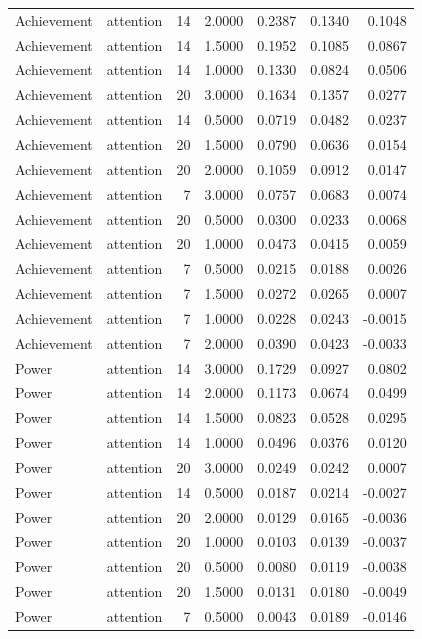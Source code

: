 \begin{tabular}{llrrrrr}
Achievement & attention & 14 & 2.0000 & 0.2387 & 0.1340 & 0.1048 \\
Achievement & attention & 14 & 1.5000 & 0.1952 & 0.1085 & 0.0867 \\
Achievement & attention & 14 & 1.0000 & 0.1330 & 0.0824 & 0.0506 \\
Achievement & attention & 20 & 3.0000 & 0.1634 & 0.1357 & 0.0277 \\
Achievement & attention & 14 & 0.5000 & 0.0719 & 0.0482 & 0.0237 \\
Achievement & attention & 20 & 1.5000 & 0.0790 & 0.0636 & 0.0154 \\
Achievement & attention & 20 & 2.0000 & 0.1059 & 0.0912 & 0.0147 \\
Achievement & attention & 7 & 3.0000 & 0.0757 & 0.0683 & 0.0074 \\
Achievement & attention & 20 & 0.5000 & 0.0300 & 0.0233 & 0.0068 \\
Achievement & attention & 20 & 1.0000 & 0.0473 & 0.0415 & 0.0059 \\
Achievement & attention & 7 & 0.5000 & 0.0215 & 0.0188 & 0.0026 \\
Achievement & attention & 7 & 1.5000 & 0.0272 & 0.0265 & 0.0007 \\
Achievement & attention & 7 & 1.0000 & 0.0228 & 0.0243 & -0.0015 \\
Achievement & attention & 7 & 2.0000 & 0.0390 & 0.0423 & -0.0033 \\
Power & attention & 14 & 3.0000 & 0.1729 & 0.0927 & 0.0802 \\
Power & attention & 14 & 2.0000 & 0.1173 & 0.0674 & 0.0499 \\
Power & attention & 14 & 1.5000 & 0.0823 & 0.0528 & 0.0295 \\
Power & attention & 14 & 1.0000 & 0.0496 & 0.0376 & 0.0120 \\
Power & attention & 20 & 3.0000 & 0.0249 & 0.0242 & 0.0007 \\
Power & attention & 14 & 0.5000 & 0.0187 & 0.0214 & -0.0027 \\
Power & attention & 20 & 2.0000 & 0.0129 & 0.0165 & -0.0036 \\
Power & attention & 20 & 1.0000 & 0.0103 & 0.0139 & -0.0037 \\
Power & attention & 20 & 0.5000 & 0.0080 & 0.0119 & -0.0038 \\
Power & attention & 20 & 1.5000 & 0.0131 & 0.0180 & -0.0049 \\
Power & attention & 7 & 0.5000 & 0.0043 & 0.0189 & -0.0146 \\

\end{tabular}
